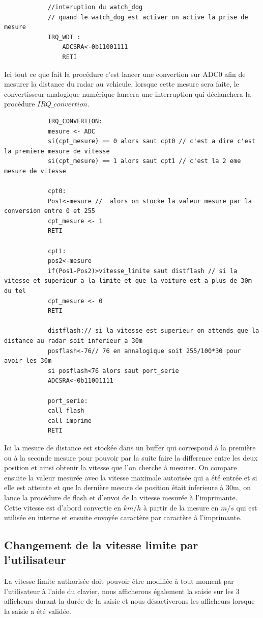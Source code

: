 \documentclass[a4paper, 12pt]{article}
\begin{document}
		\begin{lstlisting}
			//interuption du watch_dog
			// quand le watch_dog est activer on active la prise de mesure
			IRQ_WDT :
				ADCSRA<-0b11001111
				RETI
		\end{lstlisting}
		Ici tout ce que fait la procédure c'est lancer une convertion sur ADC0 afin de mesurer la distance du radar au vehicule, lorsque cette mesure sera faite, le convertisseur analogique numérique lancera une interruption qui déclanchera la procédure $IRQ\_convertion$.\\
		
		\begin{lstlisting}
			IRQ_CONVERTION:
			mesure <- ADC
			si(cpt_mesure) == 0 alors saut cpt0 // c'est a dire c'est la premiere mesure de vitesse 
			si(cpt_mesure) == 1 alors saut cpt1 // c'est la 2 eme mesure de vitesse
			
			cpt0:
			Pos1<-mesure //  alors on stocke la valeur mesure par la conversion entre 0 et 255
			cpt_mesure <- 1 
			RETI
			
			cpt1:
			pos2<-mesure
			if(Pos1-Pos2)>vitesse_limite saut distflash // si la vitesse et superieur a la limite et que la voiture est a plus de 30m du tel
			cpt_mesure <- 0
			RETI
			
			distflash:// si la vitesse est superieur on attends que la distance au radar soit inferieur a 30m
			posflash<-76// 76 en annalogique soit 255/100*30 pour avoir les 30m
			si posflash<76 alors saut port_serie 
			ADCSRA<-0b11001111
			
			port_serie:
			call flash 
			call imprime 
			RETI
		\end{lstlisting}
		Ici la mesure de distance est stockée dans un buffer qui correspond à la première ou à la seconde mesure pour pouvoir par la suite faire la difference entre les deux position et ainsi obtenir la vitesse que l'on cherche à mesurer. On compare ensuite la valeur mesurée avec la vitesse maximale autorisée qui a été entrée et si elle est atteinte et que la dernière mesure de position était inferieure à 30m, on lance la procédure de flash et d'envoi de la vitesse mesurée à l'imprimante.\\
		Cette vitesse est d'abord convertie en $km/h$ à partir de la mesure en $m/s$ qui est utilisée en interne et ensuite envoyée caractère par caractère à l'imprimante. 
		
		\subsection{Changement de la vitesse limite par l'utilisateur}
		La vitesse limite authorisée doit pouvoir être modifiée à tout moment par l'utilisateur à l'aide du clavier, nous afficherons également la saisie sur les 3 afficheurs durant la durée de la saisie et nous désactiverons les afficheurs lorsque la saisie a été validée.
		
		
\end{document}
